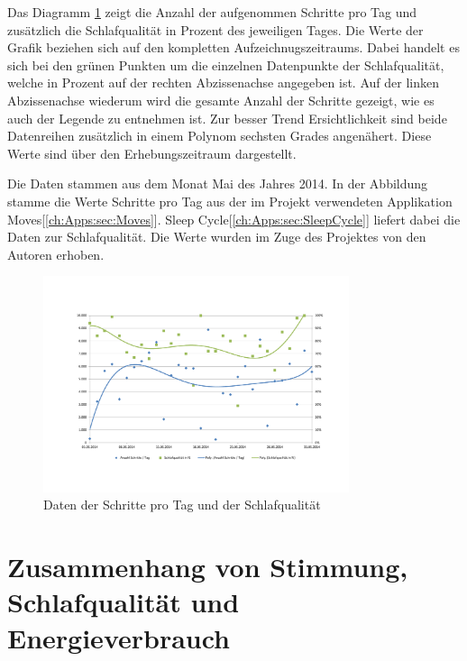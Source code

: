 Das Diagramm \ref{fig:ZusammenhangSchlafqualitätProSchrittenAmTag} zeigt die Anzahl der aufgenommen Schritte pro Tag und zusätzlich die Schlafqualität in Prozent des jeweiligen Tages.
Die Werte der Grafik beziehen sich auf den kompletten Aufzeichnugszeitraums. 
Dabei handelt es sich bei den grünen Punkten um die einzelnen Datenpunkte der Schlafqualität, welche in Prozent auf der rechten Abzissenachse angegeben ist.
Auf der linken Abzissenachse wiederum wird die gesamte Anzahl der Schritte gezeigt, wie es auch der Legende zu entnehmen ist.
Zur besser Trend Ersichtlichkeit sind beide Datenreihen zusätzlich in einem Polynom sechsten Grades angenähert.
Diese Werte sind über den Erhebungszeitraum dargestellt.

Die Daten stammen aus dem Monat Mai des Jahres 2014.
In der Abbildung stamme die Werte Schritte pro Tag aus der im Projekt verwendeten Applikation Moves[\ref{ch:Apps:sec:Moves}]. 
Sleep Cycle[\ref{ch:Apps:sec:SleepCycle}] liefert dabei die Daten zur Schlafqualität.
Die Werte wurden im Zuge des Projektes von den Autoren erhoben.

\begin{figure}[H]
\centering
        \includegraphics[angle=270,width=0.8\textwidth]{images/Analyse/Sleep-Steps} 
        \caption[Daten der Schritte pro Tag und der Schlafqualität]{Daten der Schritte pro Tag und der Schlafqualität}
        \label{fig:ZusammenhangSchlafqualitätProSchrittenAmTag}
\end{figure}




\section{Zusammenhang von Stimmung, Schlafqualität und Energieverbrauch}
\label{ch:AnalyseUndEvaluierung:sec:KorrelationVonSchlafqualitätUndSchrittenAmTag}

